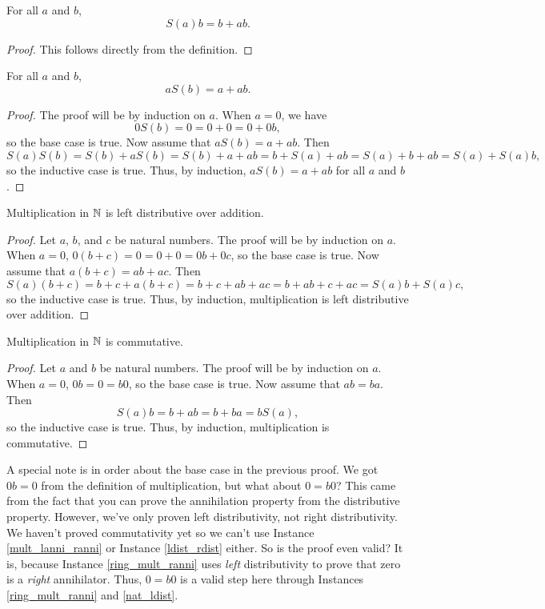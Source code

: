 \documentclass[../math.tex]{subfiles}
\begin{document}
\begin{theorem}
    For all $a$ and $b$,
    \[
        S(a)b = b + ab.
    \]
\end{theorem}
\begin{proof}
    This follows directly from the definition.
\end{proof}

\begin{theorem}
    For all $a$ and $b$,
    \[
        aS(b) = a + ab.
    \]
\end{theorem}
\begin{proof}
    The proof will be by induction on $a$.  When $a = 0$, we have
    \[
        0S(b) = 0 = 0 + 0 = 0 + 0b,
    \]
    so the base case is true.  Now assume that $aS(b) = a + ab$.  Then
    \[
        S(a)S(b) = S(b) + aS(b) = S(b) + a + ab = b + S(a) + ab = S(a) + b + ab
        = S(a) + S(a)b,
    \]
    so the inductive case is true.  Thus, by induction, $aS(b) = a + ab$ for all
    $a$ and $b$.
\end{proof}

\begin{instance} \label{nat_ldist}
    Multiplication in $\mathbb{N}$ is left distributive over addition.
\end{instance}
\begin{proof}
    Let $a$, $b$, and $c$ be natural numbers.  The proof will be by induction on
    $a$.  When $a = 0$, $0(b + c) = 0 = 0 + 0 = 0b + 0c$, so the base case is
    true.  Now assume that $a(b + c) = ab + ac$.  Then
    \[
        S(a)(b + c) = b + c + a(b + c) = b + c + ab + ac = b + ab + c + ac =
        S(a)b + S(a)c,
    \]
    so the inductive case is true.  Thus, by induction, multiplication is left
    distributive over addition.
\end{proof}

\begin{instance}
    Multiplication in $\mathbb{N}$ is commutative.
\end{instance}
\begin{proof}
    Let $a$ and $b$ be natural numbers.  The proof will be by induction on $a$.
    When $a = 0$, $0b = 0 = b0$, so the base case is true.  Now assume that $ab
    = ba$.  Then
    \[
        S(a)b = b + ab = b + ba = bS(a),
    \]
    so the inductive case is true.  Thus, by induction, multiplication is
    commutative.
\end{proof}
A special note is in order about the base case in the previous proof.  We got
$0b = 0$ from the definition of multiplication, but what about $0 = b0$?  This
came from the fact that you can prove the annihilation property from the
distributive property.  However, we've only proven left distributivity, not
right distributivity.  We haven't proved commutativity yet so we can't use
Instance \ref{mult_lanni_ranni} or Instance \ref{ldist_rdist} either.  So is the
proof even valid?  It is, because Instance \ref{ring_mult_ranni} uses
\textit{left} distributivity to prove that zero is a \textit{right} annihilator.
Thus, $0 = b0$ is a valid step here through Instances \ref{ring_mult_ranni} and
\ref{nat_ldist}.
\end{document}
